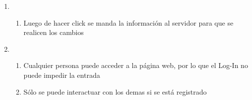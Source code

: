 \documentclass[12pt, letterpaper, notitlepage]{article}
\begin{document}
\begin{enumerate}
        \item {}
        \begin{enumerate}
            \item Luego de hacer click se manda la información al servidor para que se realicen los cambios
        \end{enumerate}

        \item {}
        \begin{enumerate}
            \item Cualquier persona puede acceder a la página web, por lo que el Log-In no puede impedir la entrada
            \item Sólo se puede interactuar con los demas si se está registrado
        \end{enumerate}


    \end{enumerate}
\end{document}
